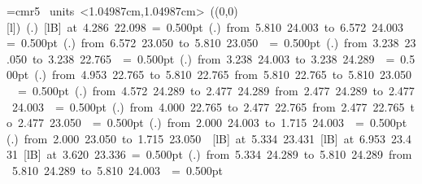 \font\thinlinefont=cmr5
%
\begingroup\makeatletter\ifx\SetFigFont\undefined%
\gdef\SetFigFont#1#2#3#4#5{%
  \reset@font\fontsize{#1}{#2pt}%
  \fontfamily{#3}\fontseries{#4}\fontshape{#5}%
  \selectfont}%
\fi\endgroup%
\mbox{\beginpicture
\setcoordinatesystem units <1.04987cm,1.04987cm>
\unitlength=1.04987cm
\linethickness=1pt
\setplotsymbol ({\makebox(0,0)[l]{\tencirc{}}})
\setshadesymbol ({\thinlinefont .})
\setlinear
%
%
 [lB] at  4.286 22.098
%
%
\linethickness= 0.500pt
\setplotsymbol ({\thinlinefont .})
{\color[rgb]{0,0,0}\putrule from  5.810 24.003 to  6.572 24.003
}%
%
%
\linethickness= 0.500pt
\setplotsymbol ({\thinlinefont .})
{\color[rgb]{0,0,0}\putrule from  6.572 23.050 to  5.810 23.050
}%
%
%
\linethickness= 0.500pt
\setplotsymbol ({\thinlinefont .})
{\color[rgb]{0,0,0}\putrule from  3.238 23.050 to  3.238 22.765
}%
%
%
\linethickness= 0.500pt
\setplotsymbol ({\thinlinefont .})
{\color[rgb]{0,0,0}\putrule from  3.238 24.003 to  3.238 24.289
}%
%
%
\linethickness= 0.500pt
\setplotsymbol ({\thinlinefont .})
{\color[rgb]{0,0,0}\putrule from  4.953 22.765 to  5.810 22.765
\putrule from  5.810 22.765 to  5.810 23.050
}%
%
%
\linethickness= 0.500pt
\setplotsymbol ({\thinlinefont .})
{\color[rgb]{0,0,0}\putrule from  4.572 24.289 to  2.477 24.289
\putrule from  2.477 24.289 to  2.477 24.003
}%
%
%
\linethickness= 0.500pt
\setplotsymbol ({\thinlinefont .})
{\color[rgb]{0,0,0}\putrule from  4.000 22.765 to  2.477 22.765
\putrule from  2.477 22.765 to  2.477 23.050
}%
%
%
\linethickness= 0.500pt
\setplotsymbol ({\thinlinefont .})
{\color[rgb]{0,0,0}\putrule from  2.000 24.003 to  1.715 24.003
}%
%
%
\linethickness= 0.500pt
\setplotsymbol ({\thinlinefont .})
{\color[rgb]{0,0,0}\putrule from  2.000 23.050 to  1.715 23.050
}%
%
%
 [lB] at  5.334 23.431
%
%
 [lB] at  6.953 23.431
%
%
 [lB] at  3.620 23.336
%
%
\linethickness= 0.500pt
\setplotsymbol ({\thinlinefont .})
{\color[rgb]{0,0,0}\putrule from  5.334 24.289 to  5.810 24.289
\putrule from  5.810 24.289 to  5.810 24.003
}%
%
%
\linethickness= 0.500pt
}
